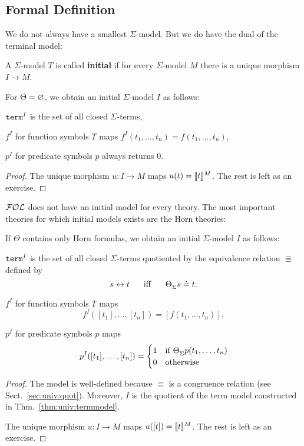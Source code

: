 \subsection{Formal Definition}

We do not always have a smallest $\Sigma$-model.
But we do have the dual of the terminal model:

\begin{definition}
A $\Sigma$-model $T$ is called \textbf{initial} if for every $\Sigma$-model $M$ there is a unique morphism $I\to M$.
\end{definition}

\begin{theorem}\label{thm:univ:termmodel}
For $\Theta=\varnothing$, we obtain an initial $\Sigma$-model $I$ as follows:
\begin{compactitem}
 \item $\mathtt{term}^I$ is the set of all closed $\Sigma$-terms,
 \item $f^I$ for function symbols $T$ maps $f^I(t_1,\ldots,t_n)=f(t_1,\ldots,t_n)$,
 \item $p^I$ for predicate symbols $p$ always returns $0$.
\end{compactitem}
\end{theorem}
\begin{proof}
The unique morphism $u:I\to M$ maps $u(t)=\llbracket t\rrbracket^{M}$.
The rest is left as an exercise.
\end{proof}

${\mathcal{FOL}}$ does not have an initial model for every theory.
The most important theories for which initial models exists are the Horn theories:

\begin{theorem}\label{thm:univ:termmodel2}
If $\Theta$ contains only Horn formulas, we obtain an initial $\Sigma$-model $I$ as follows:
\begin{compactitem}
 \item $\mathtt{term}^I$ is the set of all closed $\Sigma$-terms quotiented by the equivalence relation $\Equiv$ defined by
   \[s\Equiv t  \tb\miff\tb \iscons{\Sigma}{}{\Theta}{s\doteq t}.\]
 \item $f^I$ for function symbols $T$ maps \[f^I([t_1],\ldots,[t_n])=[f(t_1,\ldots,t_n)],\]
 \item $p^I$ for predicate symbols $p$ maps \[p^I([t_1],\ldots,[t_n])=\cas{1\mifc \iscons{\Sigma}{}{\Theta}{p(t_1,\ldots,t_n)}\\0\mothw}\]
\end{compactitem}
\end{theorem}
\begin{proof}
The model is well-defined because $\Equiv$ is a congruence relation (see Sect.~\ref{sec:univ:quot}).
Moreover, $I$ is the quotient of the term model constructed in Thm.~\ref{thm:univ:termmodel}.

The unique morphism $u:I\to M$ maps $u([t])=\llbracket t\rrbracket^{M}$.
The rest is left as an exercise.
\end{proof}

